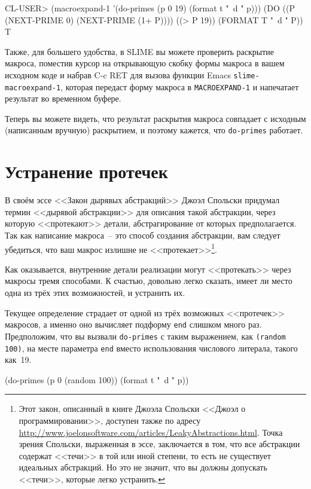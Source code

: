 \begin{myverb}
  CL-USER> (macroexpand-1 '(do-primes (p 0 19) (format t "~d " p)))
  (DO ((P (NEXT-PRIME 0) (NEXT-PRIME (1+ P))))
      ((> P 19))
    (FORMAT T "~d " P))
  T
\end{myverb}

Также, для большего удобства, в SLIME вы можете проверить раскрытие макроса, поместив
курсор на открывающую скобку формы макроса в вашем исходном коде и набрав C-c RET для
вызова функции Emacs \lstinline{slime-macroexpand-1}, которая передаст форму макроса в
\lstinline{MACROEXPAND-1} и напечатает результат во временном буфере.

Теперь вы можете видеть, что результат раскрытия макроса совпадает с исходным (написанным
вручную) раскрытием, и поэтому кажется, что \lstinline{do-primes} работает.

\section{Устранение протечек}

В своём эссе <<Закон дырявых абстракций>> Джоэл Спольски придумал термин <<дырявой
абстракции>> для описания такой абстракции, через которую <<протекают>> детали,
абстрагирование от которых предполагается. Так как написание макроса~-- это способ
создания абстракции, вам следует убедиться, что ваш макрос излишне не
<<протекает>>\footnote{Этот закон, описанный в книге Джоэла Спольски <<Джоэл о
  программировании>>, доступен также по адресу
  \url{http://www.joelonsoftware.com/articles/LeakyAbstractions.html}. Точка зрения
  Спольски, выраженная в эссе, заключается в том, что все абстракции содержат <<течи>> в той
  или иной степени, то есть не существует идеальных абстракций. Но это не значит, что вы
  должны допускать <<течи>>, которые легко устранить.}.

Как оказывается, внутренние детали реализации могут <<протекать>> через макросы тремя
способами. К счастью, довольно легко сказать, имеет ли место одна из трёх этих
возможностей, и устранить их.

Текущее определение страдает от одной из трёх возможных <<протечек>> макросов, а именно оно
вычисляет подформу \lstinline{end} слишком много раз. Предположим, что вы вызвали
\lstinline{do-primes} с таким выражением, как \lstinline{(random 100)}, на месте параметра
\lstinline{end} вместо использования числового литерала, такого как~19.

\begin{myverb}
(do-primes (p 0 (random 100))
  (format t "~d " p))
\end{myverb}

